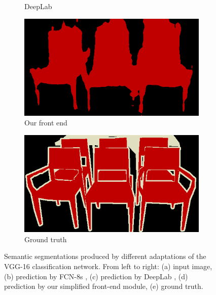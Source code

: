 \documentclass{article} %
\begin{document}
\begin{figure}[t]
\begin{subfigure}[b]{0.19\linewidth}
        \caption{DeepLab}
  \end{subfigure}
  \begin{subfigure}[b]{0.19\linewidth}
    \includegraphics[width=\textwidth]{figs/ab/step8_voc/2008_001439}
        \caption{Our front end}
  \end{subfigure}
  \begin{subfigure}[b]{0.19\linewidth}
    \includegraphics[width=\textwidth]{figs/ab/gt/2008_001439}
        \caption{Ground truth}
  \end{subfigure}

\vspace{-2mm}
\caption{Semantic segmentations produced by different adaptations of the VGG-16 classification network. From left to right: (a) input image, (b) prediction by FCN-8s \citep{Long2015}, (c) prediction by DeepLab \citep{Chen2015ICLR}, (d) prediction by our simplified front-end module, (e) ground truth.}
\label{fig:unary}

\vspace{2mm}


\end{figure}
\end{document}
